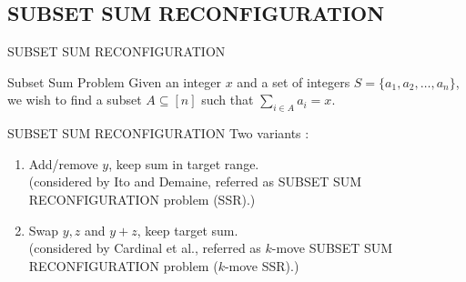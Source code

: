 \subsection{SUBSET SUM RECONFIGURATION}

\begin{frame}{SUBSET SUM RECONFIGURATION}
  \begin{block}{Subset Sum Problem}
      Given an integer $x$ and a set of integers $S = \{a_1, a_2, \dots, a_n\}$, we wish 
      to find a subset $A \subseteq [n]$ such that $\sum_{i \in A} a_{i} = x.$
  \end{block}
   \begin{block}{SUBSET SUM RECONFIGURATION}
    Two variants : 
      \begin{enumerate}
          \setlength\itemsep{1em}
          \item Add/remove $y$, keep sum in target range. \\
          ({\footnotesize considered by Ito and Demaine, referred as SUBSET SUM RECONFIGURATION problem (SSR).}) \\ 
          
          \item Swap $y, z$ and $y + z$, keep target sum. \\
          ({\footnotesize considered by Cardinal et al., referred as $k$-move SUBSET SUM RECONFIGURATION problem ($k$-move SSR).}) 
      \end{enumerate}
    \end{block}

\end{frame}

